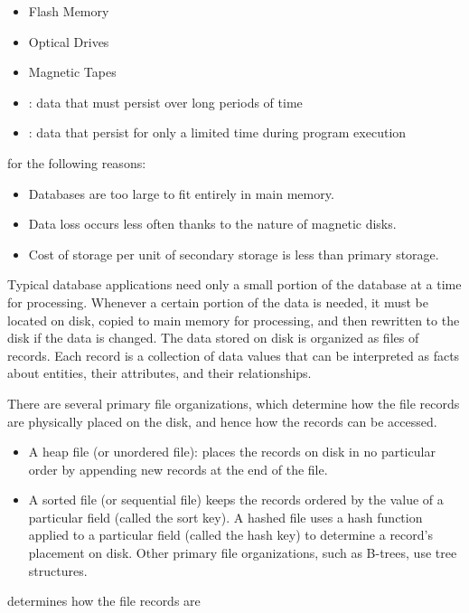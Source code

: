       \begin{itemize}
        \item Flash Memory
        \item Optical Drives
        \item Magnetic Tapes
      \end{itemize}

    \begin{itemize}
      \item {}: data that must persist over long periods of time
      \item {}: data that persist for only a limited time during program execution
    \end{itemize}
    \par {} for the following reasons:
    \begin{itemize}
      \item Databases are too large to fit entirely in main memory.
      \item Data loss occurs less often thanks to the  nature of magnetic disks.
      \item Cost of storage per unit of secondary storage is less than primary storage.
    \end{itemize}
    \par Typical database applications need only a small portion of the database at a time for processing. Whenever a certain portion of the data is needed, it must be located on disk, copied to main memory for processing, and then rewritten to the disk if the data is changed. The data stored on disk is organized as files of records. Each record is a collection of data values that can be interpreted as facts about entities, their attributes, and their relationships.
    \par There are several primary file organizations, which determine how the file records are physically placed on the disk, and hence how the records can be accessed.
    \begin{itemize}
      \item A heap file (or unordered file): places the records on disk in no
        particular order by appending new records at the end of the file.
      \item A sorted file (or sequential file) keeps the records ordered by the value of a particular field (called the sort key). A hashed file uses a hash function applied to a particular field (called the hash key) to determine a record’s placement on disk. Other primary file organizations, such as B-trees, use tree structures.
    \end{itemize}
    \par {} determines how the file records are
